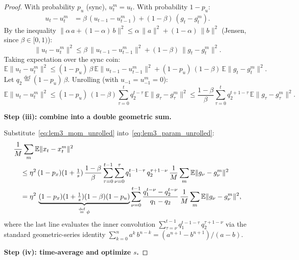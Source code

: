 \documentclass{article}
\begin{document}
\begin{proof}
With probability $p_u$ (sync), $u_t^m = u_t$. With probability $1 - p_u$:
\begin{align}
u_t - u_t^m
&= \beta\,(u_{t-1} - u_{t-1}^m) + (1-\beta)\,(g_t - g_t^m).
\label{eq:lem3_mom_nosync}
\end{align}
By the inequality $\|\alpha\,a + (1-\alpha)\,b\|^2 \leq
\alpha\,\|a\|^2 + (1-\alpha)\,\|b\|^2$ (Jensen, since $\beta \in [0,1)$):
\begin{equation}
\|u_t - u_t^m\|^2
\leq \beta\,\|u_{t-1} - u_{t-1}^m\|^2
+ (1-\beta)\,\|g_t - g_t^m\|^2.
\label{eq:lem3_mom_jensen}
\end{equation}
Taking expectation over the sync coin:
\begin{equation}
\mathbb{E}\|u_t - u_t^m\|^2
\leq (1-p_u)\,\beta\,\mathbb{E}\|u_{t-1} - u_{t-1}^m\|^2
+ (1-p_u)\,(1-\beta)\,\mathbb{E}\|g_t - g_t^m\|^2.
\label{eq:lem3_mom_recur}
\end{equation}
Let $q_2 \stackrel{\text{def}}{=} (1-p_u)\,\beta$. Unrolling (with $u_{-1} = u_{-1}^m = 0$):
\begin{equation}
\mathbb{E}\|u_t - u_t^m\|^2
\leq (1-p_u)\,(1-\beta)\sum_{\tau=0}^{t}
q_2^{t-\tau}\,\mathbb{E}\|g_\tau - g_\tau^m\|^2
\leq \frac{1-\beta}{\beta}\sum_{\tau=0}^{t}
q_2^{t+1-\tau}\,\mathbb{E}\|g_\tau - g_\tau^m\|^2.
\label{eq:lem3_mom_unrolled}
\end{equation}

\medskip
\noindent\textbf{Step (iii): combine into a double geometric sum.}

Substitute~\eqref{eq:lem3_mom_unrolled} into~\eqref{eq:lem3_param_unrolled}:
\begin{align}
&\frac{1}{M}\sum_m\mathbb{E}\|x_t - x_t^m\|^2 \notag \\
&\quad\leq \eta^2\,(1-p_x)(1+\tfrac{1}{s})\,\frac{1-\beta}{\beta}
\sum_{\tau=0}^{t-1}\sum_{\nu=0}^{\tau}
q_1^{t-1-\tau}\,q_2^{\tau+1-\nu}\,
\frac{1}{M}\sum_m\mathbb{E}\|g_\nu - g_\nu^m\|^2 \notag \\
&\quad= \eta^2\,\underbrace{(1-p_x)(1+\tfrac{1}{s})(1-\beta)(1-p_u)
}_{\stackrel{\text{def}}{=}\;\phi}
\sum_{\nu=0}^{t-1}\frac{q_1^{t-\nu} - q_2^{t-\nu}}{q_1 - q_2}\,
\frac{1}{M}\sum_m\mathbb{E}\|g_\nu - g_\nu^m\|^2,
\label{eq:lem3_double_geom}
\end{align}
where the last line evaluates the inner convolution
$\sum_{\tau=\nu}^{t-1}q_1^{t-1-\tau}\,q_2^{\tau+1-\nu}$ via the standard
geometric-series identity
$\sum_{k=0}^{n}a^k\,b^{n-k} = (a^{n+1} - b^{n+1})/(a - b)$.

\medskip
\noindent\textbf{Step (iv): time-average and optimize $s$.}


\end{proof}
\end{document}
